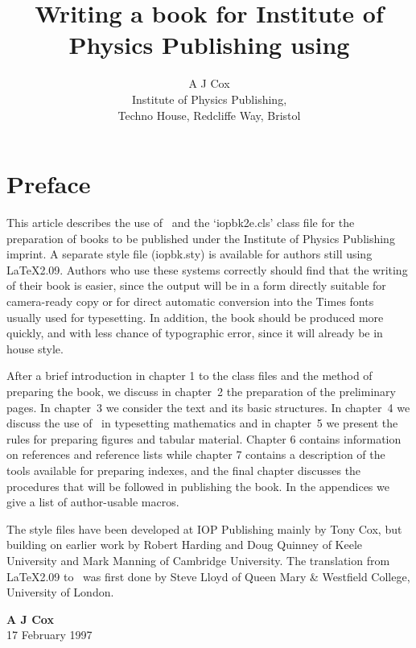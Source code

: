 \documentclass{iopbk2e}
\title{Writing a book for Institute of Physics Publishing using 
\LaTeXe}
\author{A J Cox\\[2pc]
Institute of Physics Publishing,\\
Techno House, Redcliffe Way, Bristol}
\begin{document}
\maketitle
{}
\setcounter{page}{5}
\tableofcontents

\chapter*{Preface}
This article describes the use of \LaTeXe\ and the `iopbk2e.cls' 
class file for the preparation of books to be 
published under the Institute of Physics Publishing imprint. 
A separate style file (iopbk.sty)
is available for authors still using \LaTeX 2.09.
Authors who use these systems
correctly should find that the writing of their book is
easier, since the output will be in a form directly suitable for 
camera-ready copy or for direct automatic conversion into the Times 
fonts usually used for typesetting. 
In addition, the book should be produced more quickly, and 
with less chance of typographic error, since it will already be
in house style. 

After a brief introduction in chapter 1 to 
the class files and the method of 
preparing the book, we discuss in chapter~2 the 
preparation of the preliminary pages. In chapter~3 we consider the 
text and its basic structures.
In chapter~4 we discuss the use of \LaTeXe\ in typesetting mathematics 
and in 
chapter~5 we present the rules for preparing figures and tabular 
material. Chapter 6 contains information on references and reference 
lists while chapter 7 contains a description of the tools available 
for preparing indexes, 
and the final chapter discusses the procedures that will be 
followed in publishing the book. In the appendices we give a list of 
author-usable macros.

The style files have been developed at IOP Publishing mainly by Tony 
Cox, but building on earlier work by Robert Harding and Doug Quinney of
Keele University and Mark Manning of Cambridge University. The translation
from \LaTeX2.09 to \LaTeXe\ was first done by Steve Lloyd of Queen Mary \&
Westfield College, University of London. 

\bigskip
\begin{flushright}
{\bf A J Cox}\\
17 February 1997
\end{flushright}
\newpage

\setcounter{page}{1}
\end{document}
